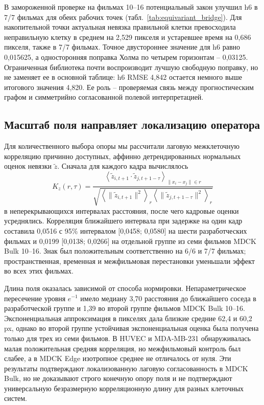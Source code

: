 \documentclass[11pt,a4paper]{article}
\begin{document}
В замороженной проверке на фильмах 10--16 потенциальный закон улучшил h6 в 7/7 фильмах для обеих рабочих точек (табл.~\ref{tab:equivariant_bridge}). Для накопительной точки актуальная невязка правильной клетки превосходила неправильную клетку в среднем на 2,529 пикселя и устаревшее время на 0,686 пикселя, также в 7/7 фильмах. Точное двустороннее значение для h6 равно 0,015625, а односторонняя поправка Холма по четырем горизонтам -- 0,03125. Ограниченная библиотека почти воспроизводит лучшую свободную поправку, но не заменяет ее в основной таблице: h6 RMSE 4,842 остается немного выше итогового значения 4,820. Ее роль -- проверяемая связь между прогностическим графом и симметрийно согласованной полевой интерпретацией.

\subsection{Масштаб поля направляет локализацию оператора}
Для количественного выбора опоры мы рассчитали лаговую межклеточную корреляцию причинно доступных, аффинно детрендированных нормальных оценок невязки $\widetilde z$. Сначала для каждого кадра вычислялось
\begin{equation}
K_z(r,\tau)=
\frac{
\left\langle \widetilde z_{i,t+1}\cdot
\widetilde z_{j,t+1-\tau}\right\rangle_{\|x_i-x_j\|\in r}
}{
\sqrt{
\left\langle\|\widetilde z_{i,t+1}\|^2\right\rangle_r
\left\langle\|\widetilde z_{j,t+1-\tau}\|^2\right\rangle_r
}
}
\end{equation}
в неперекрывающихся интервалах расстояния, после чего кадровые оценки усреднялись. Корреляция ближайшего интервала при задержке на один кадр составила 0,0516 с 95\% интервалом [0,0458; 0,0580] на шести разработческих фильмах и 0,0199 [0,0138; 0,0266] на отдельной группе из семи фильмов MDCK Bulk 10--16. Знак был положительным соответственно на 6/6 и 7/7 фильмах; пространственная, временная и межфильмовая перестановки уменьшали эффект во всех этих фильмах.

Длина поля оказалась зависимой от способа нормировки. Непараметрическое пересечение уровня $e^{-1}$ имело медиану 3,70 расстояния до ближайшего соседа в разработческой группе и 1,39 во второй группе фильмов MDCK Bulk 10--16. Экспоненциальная аппроксимация в пикселях дала близкие средние 62,4 и 60,2 px, однако во второй группе устойчивая экспоненциальная оценка была получена только для трех из семи фильмов. В HUVEC и MDA-MB-231 обнаруживалась малая положительная средняя корреляция, но межфильмовый контроль был слабее, а в MDCK Edge изотропное среднее не отличалось от нуля. Эти результаты подтверждают локализованную лаговую согласованность в MDCK Bulk, но не доказывают строго конечную опору поля и не подтверждают универсальную безразмерную корреляционную длину для разных клеточных систем.
\end{document}
